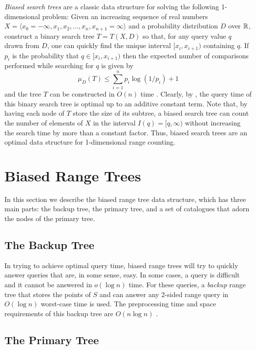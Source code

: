 \documentclass[charterfonts]{patmorin}
\begin{document}
\emph{Biased search trees} are a classic data structure for solving
the following 1-dimensional problem:  Given an increasing sequence of
real numbers $X=\langle x_0=-\infty,x_1,x_2,\ldots ,
x_n,x_{n+1}=\infty\rangle$ and a probability distribution $D$ over
$\mathbb{R}$, construct a binary search tree  $T=T(X,D)$ so that, for any
query value $q$ drawn from $D$, one can quickly find the unique
interval $[x_i,x_{i+1})$ containing $q$.  If $p_i$ is the probability
that $q\in[x_i,x_{i+1})$ then the expected number of comparisons
performed while searching for $q$ is given
by
\[
   \mu_D(T) \le \sum_{i=1}^{n} p_i\log(1/p_i) + 1 
\]
and the tree $T$ can be constructed in $O(n)$ time \cite{m75}.
Clearly, by , the query time of this binary search
tree is optimal up to an additive constant term.  Note that, by having
each node of $T$ store the size of its subtree, a biased search tree
can count the number of elements of $X$ in the interval
$I(q)=[q,\infty)$ without increasing the search time by more than a
constant factor.  Thus, biased search trees are an optimal data
structure for 1-dimensional range counting.

\section{Biased Range Trees}

In this section we describe the biased range tree data structure,
which has three main parts: the backup tree, the primary tree, and a
set of catalogues that adorn the nodes of the primary tree.

\subsection{The Backup Tree}

In trying to achieve optimal query time, biased range trees will try
to quickly answer queries that are, in some sense, easy.  In some
cases, a query is difficult and it cannot be answered in $o(\log n)$
time.  For these queries, a \emph{backup} range tree that stores the
points of $S$ and can answer any 2-sided range query in $O(\log n)$
worst-case time is used.  The preprocessing time and space
requirements of this backup tree are $O(n\log n)$ \cite{bkos97}.

\subsection{The Primary Tree}
\end{document}
